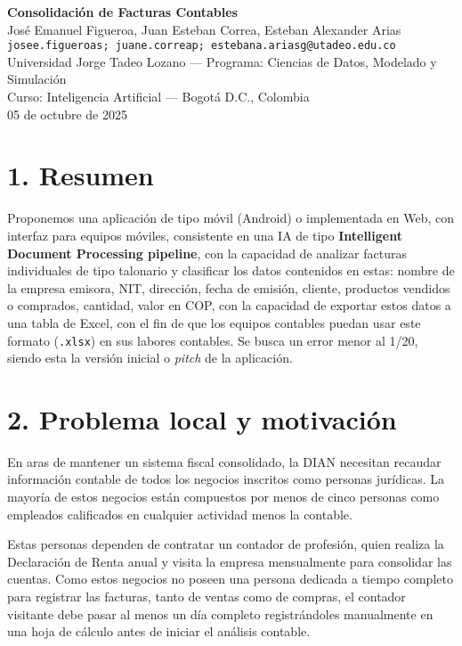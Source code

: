 \documentclass[12pt,a4paper]{article}
\begin{document}
\begin{center}
    {\LARGE \textbf{Consolidación de Facturas Contables}}\\[0.4cm]
    {\large José Emanuel Figueroa, Juan Esteban Correa, Esteban Alexander Arias}\\[0.2cm]
    \texttt{josee.figueroas; juane.correap; estebana.ariasg@utadeo.edu.co}\\[0.3cm]
    Universidad Jorge Tadeo Lozano — Programa: Ciencias de Datos, Modelado y Simulación\\
    Curso: Inteligencia Artificial — Bogotá D.C., Colombia\\
    05 de octubre de 2025
\end{center}

\vspace{0.5cm}

\section*{1. Resumen}

Proponemos una aplicación de tipo móvil (Android) o implementada en Web, con interfaz para equipos móviles, consistente en una IA de tipo \textbf{Intelligent Document Processing pipeline}, con la capacidad de analizar facturas individuales de tipo talonario y clasificar los datos contenidos en estas: nombre de la empresa emisora, NIT, dirección, fecha de emisión, cliente, productos vendidos o comprados, cantidad, valor en COP, con la capacidad de exportar estos datos a una tabla de Excel, con el fin de que los equipos contables puedan usar este formato (\texttt{.xlsx}) en sus labores contables. Se busca un error menor al 1/20, siendo esta la versión inicial o \textit{pitch} de la aplicación.

\section*{2. Problema local y motivación}

En aras de mantener un sistema fiscal consolidado, la DIAN  necesitan recaudar información contable de todos los negocios inscritos como personas jurídicas. La mayoría de estos negocios están compuestos por menos de cinco personas como empleados calificados en cualquier actividad menos la contable.

Estas personas dependen de contratar un contador de profesión, quien realiza la Declaración de Renta anual y visita la empresa mensualmente para consolidar las cuentas. Como estos negocios no poseen una persona dedicada a tiempo completo para registrar las facturas, tanto de ventas como de compras, el contador visitante debe pasar al menos un día completo registrándoles manualmente en una hoja de cálculo antes de iniciar el análisis contable. 
\end{document}
